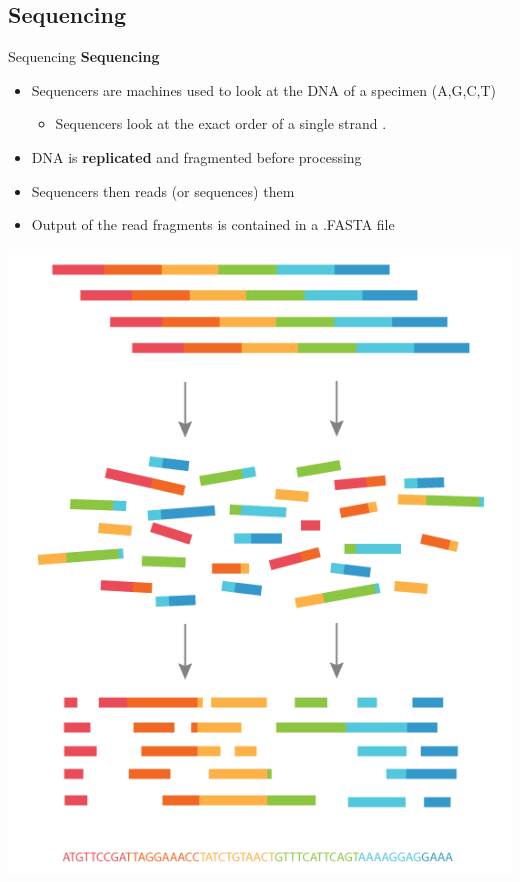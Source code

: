 \documentclass{beamer}
\begin{document}
    \subsection{Sequencing}
    \begin{frame}{Sequencing}
        \textbf{Sequencing}
    \begin{itemize}
        \item Sequencers are machines used to look at the DNA of a specimen (A,G,C,T)
        \begin{itemize}
            \item Sequencers look at the exact order of a single strand \cite{genomics-definition}. 
        \end{itemize}
        \item DNA is \textbf{replicated} and fragmented before processing
        \item Sequencers then reads (or sequences) them
        \item Output of the read fragments is contained in a .FASTA file
    \end{itemize}
            \centering
        \includegraphics[scale=0.2]{sequencing.png}
    \end{frame}
    
\end{document}
